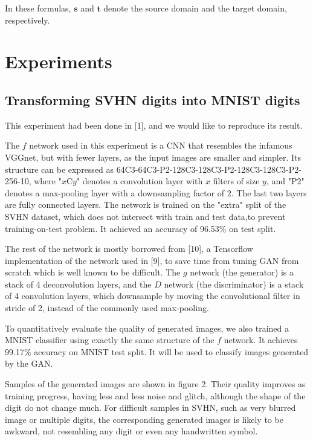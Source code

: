 \documentclass{article}
\begin{document}
In these formulas, $\mathbf{s}$ and $\mathbf{t}$ denote the source domain and the target domain, respectively.

\section{Experiments}

\subsection{Transforming SVHN digits into MNIST digits}

This experiment had been done in [1], and we would like to reproduce its result.

The $f$ network used in this experiment is a CNN that resembles the infamous VGGnet, but with fewer layers, as the input images are smaller and simpler. Its structure can be expressed as 64C3-64C3-P2-128C3-128C3-P2-128C3-128C3-P2-256-10, where "$x$C$y$" denotes a convolution layer with $x$ filters of size $y$, and "P2" denotes a max-pooling layer with a downsampling factor of 2. The last two layers are fully connected layers. The network is trained on the "extra" split of the SVHN dataset, which does not intersect with train and test data,to prevent training-on-test problem. It achieved an accuracy of 96.53\% on test split.

The rest of the network is mostly borrowed from [10], a Tensorflow implementation of the network used in [9], to save time from tuning GAN from scratch which is well known to be difficult. The $g$ network (the generator) is a stack of 4 deconvolution layers, and the $D$ network (the discriminator) is a stack of 4 convolution layers, which downsample by moving the convolutional filter in stride of 2, instead of the commonly used max-pooling.

To quantitatively evaluate the quality of generated images, we also trained a MNIST classifier using exactly the same structure of the $f$ network. It achieves 99.17\% accuracy on MNIST test split. It will be used to classify images generated by the GAN.

Samples of the generated images are shown in figure 2. Their quality improves as training progress, having less and less noise and glitch, although the shape of the digit do not change much. For difficult samples in SVHN, such as very blurred image or multiple digits, the corresponding generated images is likely to be awkward, not resembling any digit or even any handwritten symbol.
\end{document}
